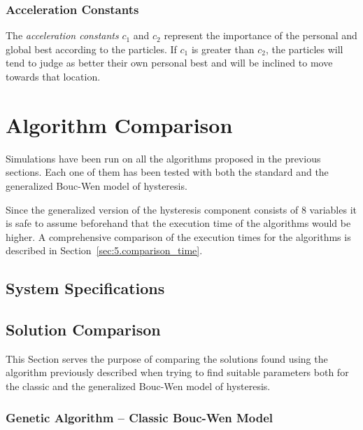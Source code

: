 \subsubsection{Acceleration Constants}
\label{sec:5.pso.constants}

The \textit{acceleration constants} $c_1$ and $c_2$ represent
the importance of the personal and global best according to the particles.
If $c_1$ is greater than $c_2$, the particles will tend to judge as better
their own personal best and will be inclined to move towards that location.


\section{Algorithm Comparison}
\label{sec:5.res}

Simulations have been run on all the algorithms proposed in the previous sections.
Each one of them has been tested with both the standard and the generalized Bouc-Wen
model of hysteresis.

Since the generalized version of the hysteresis component consists of 8 variables
it is safe to assume beforehand that the execution time of the algorithms would be higher.
A comprehensive comparison of the execution times for the algorithms is described in
Section~\ref{sec:5.comparison_time}.



\subsection{System Specifications}



\subsection{Solution Comparison}
\label{sec:5.comparison_res}

This Section serves the purpose of comparing the solutions found using the
algorithm previously described when trying to find suitable parameters
both for the classic and the generalized Bouc-Wen model of hysteresis.

\subsubsection{Genetic Algorithm -- Classic Bouc-Wen Model}

